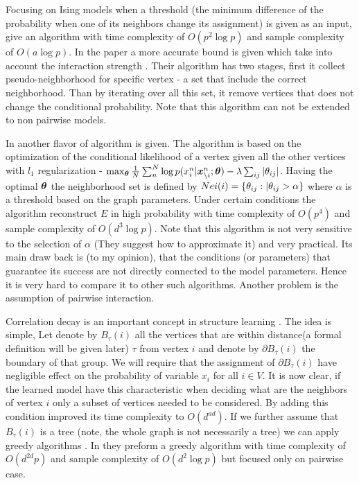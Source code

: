 Focusing on Ising models when a threshold (the minimum difference of the probability when one of its neighbors change its assignment) is given as an input,  \cite{bresler2015efficiently} give an algorithm with time complexity of $O(p^2\log p)$ and sample complexity of $O( a \log p)$. In the paper a more accurate bound is given  which take into account the interaction strength . Their algorithm has two stages,  first it collect pseudo-neighborhood for specific vertex - a set that include the correct neighborhood. Than by iterating over all this set, it remove vertices that does not change the conditional probability. Note that this algorithm can not be extended to non pairwise models.

In \cite{ravikumar2010high} another flavor of algorithm is given. The algorithm is based on the optimization of the conditional likelihood of a vertex given all the other vertices with $l_1$ regularization - $\max_{\boldsymbol{\theta}} \frac{1}{N}\sum_n^N \log p(x^n_i| \boldsymbol{x}^n_{\setminus i};\boldsymbol{\theta}) - \lambda \sum_{ij} |\theta_{ij}|$. Having the optimal $\boldsymbol{\theta}$ the neighborhood set is defined by $Nei(i) = \{\theta_{ij} : |\theta_{ij} > \alpha\}$ where $\alpha$ is a threshold based on the graph parameters. Under certain conditions the algorithm reconstruct $E$ in high probability with time complexity of $O(p^4)$  and sample complexity of $O( d^3 \log p)$. Note that this algorithm is not very sensitive to the selection of $\alpha$ (They suggest how to approximate it) and very practical. Its main draw back is (to my opinion), that the conditions (or parameters) that guarantee its success are not directly connected to the model parameters. Hence it is very hard to compare it to other such algorithms. Another problem is the assumption of pairwise interaction.     

Correlation decay is an important concept in structure learning \cite{montanari2009graphical}. The idea is simple, Let denote by $B_{\tau}(i)$ all the vertices that are within distance(a formal definition will be given later) $\tau$ from vertex $i$ and denote by $\partial B_{\tau}(i)$ the boundary of that group. We will require that the assignment of $\partial B_{\tau}(i)$ have negligible effect on the probability of variable $x_i$ for all $i \in V$. It is now clear, if the learned model have this characteristic when deciding what are the neighbors of vertex $i$ only a subset of vertices needed to be considered. By adding this condition \cite{bresler2008reconstruction} improved its time complexity to $O(d^{ad})$. If we further assume that $B_{\tau}(i)$ is a tree (note, the whole graph is not necessarily a tree) we can apply greedy algorithms \cite{netrapalli2010greedy, anandkumar2013learning}. In \cite{anandkumar2013learning} they preform a greedy algorithm with time complexity of $O(d^{2d}p)$ and sample complexity of $O(d^2\log p)$ but focused only on pairwise case.  

